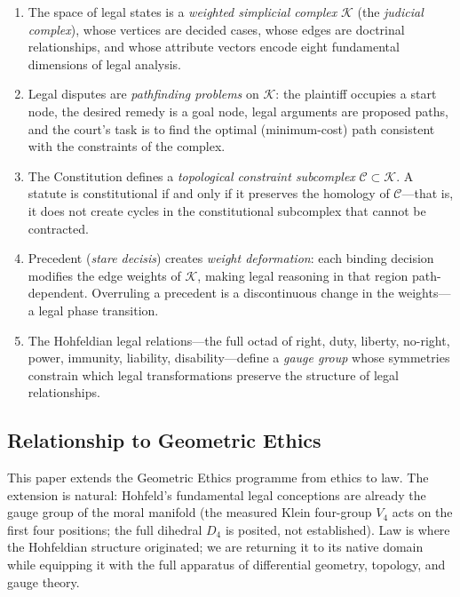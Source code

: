 \documentclass[12pt]{article}
\theoremstyle{definition}
\theoremstyle{remark}
\newcommand{\C}{\mathcal{C}}               %
\begin{document}
\begin{enumerate}[label=(\roman*)]
    \item The space of legal states is a \emph{weighted simplicial complex} $\mathcal{K}$ (the \emph{judicial complex}), whose vertices are decided cases, whose edges are doctrinal relationships, and whose attribute vectors encode eight fundamental dimensions of legal analysis.
    \item Legal disputes are \emph{pathfinding problems} on $\mathcal{K}$: the plaintiff occupies a start node, the desired remedy is a goal node, legal arguments are proposed paths, and the court's task is to find the optimal (minimum-cost) path consistent with the constraints of the complex.
    \item The Constitution defines a \emph{topological constraint subcomplex} $\C \subset \mathcal{K}$.  A statute is constitutional if and only if it preserves the homology of $\C$---that is, it does not create cycles in the constitutional subcomplex that cannot be contracted.
    \item Precedent (\emph{stare decisis}) creates \emph{weight deformation}: each binding decision modifies the edge weights of $\mathcal{K}$, making legal reasoning in that region path-dependent.  Overruling a precedent is a discontinuous change in the weights---a legal phase transition.
    \item The Hohfeldian legal relations---the full octad of right, duty, liberty, no-right, power, immunity, liability, disability---define a \emph{gauge group} whose symmetries constrain which legal transformations preserve the structure of legal relationships.
\end{enumerate}

\subsection{Relationship to Geometric Ethics}

This paper extends the Geometric Ethics programme \cite{bond2026geometric,bond2026sge,bond2026noether,bond2025eip} from ethics to law.  The extension is natural: Hohfeld's fundamental legal conceptions \cite{hohfeld1913} are already the gauge group of the moral manifold (the measured Klein four-group $V_4$ acts on the first four positions; the full dihedral $D_4$ is posited, not established).  Law is where the Hohfeldian structure originated; we are returning it to its native domain while equipping it with the full apparatus of differential geometry, topology, and gauge theory.
\end{document}
